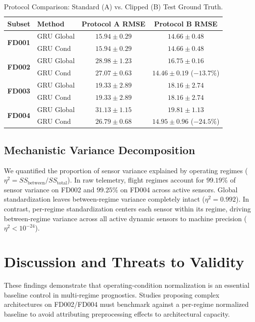\documentclass[conference]{IEEEtran}
\begin{document}
\begin{table}[t]
\caption{Protocol Comparison: Standard (A) vs. Clipped (B) Test Ground Truth.}
\label{tab:protocols}
\centering
\begin{tabular}{llcc}
\toprule
Subset & Method & Protocol A RMSE & Protocol B RMSE \\
\midrule
\multirow{2}{*}{\textbf{FD001}} & GRU Global & $15.94 \pm 0.29$ & $14.66 \pm 0.48$ \\
 & GRU Cond & $15.94 \pm 0.29$ & $14.66 \pm 0.48$ \\
\midrule
\multirow{2}{*}{\textbf{FD002}} & GRU Global & $28.98 \pm 1.23$ & $16.75 \pm 0.16$ \\
 & GRU Cond & $\mathbf{27.07 \pm 0.63}$ & $\mathbf{14.46 \pm 0.19}$ ($-13.7\%$) \\
\midrule
\multirow{2}{*}{\textbf{FD003}} & GRU Global & $19.33 \pm 2.89$ & $18.16 \pm 2.74$ \\
 & GRU Cond & $19.33 \pm 2.89$ & $18.16 \pm 2.74$ \\
\midrule
\multirow{2}{*}{\textbf{FD004}} & GRU Global & $31.13 \pm 1.15$ & $19.81 \pm 1.13$ \\
 & GRU Cond & $\mathbf{26.79 \pm 0.68}$ & $\mathbf{14.95 \pm 0.96}$ ($-24.5\%$) \\
\bottomrule
\end{tabular}
\end{table}

\subsection{Mechanistic Variance Decomposition}
We quantified the proportion of sensor variance explained by operating regimes ($\eta^2 = SS_{\text{between}} / SS_{\text{total}}$). In raw telemetry, flight regimes account for $99.19\%$ of sensor variance on FD002 and $99.25\%$ on FD004 across active sensors. Global standardization leaves between-regime variance completely intact ($\eta^2 = 0.992$). In contrast, per-regime standardization centers each sensor within its regime, driving between-regime variance across all active dynamic sensors to machine precision ($\eta^2 < 10^{-24}$).

\section{Discussion and Threats to Validity}
These findings demonstrate that operating-condition normalization is an essential baseline control in multi-regime prognostics. Studies proposing complex architectures on FD002/FD004 must benchmark against a per-regime normalized baseline to avoid attributing preprocessing effects to architectural capacity.
\end{document}
